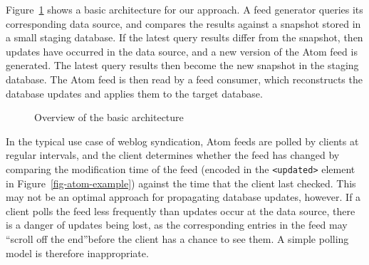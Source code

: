 \documentclass{CRPITStyle}
\begin{document}
Figure~\ref{fig-basic} shows a basic architecture for our approach. A
feed generator queries its corresponding data source, and compares the
results against a snapshot stored in a small staging database. If the
latest query results differ from the snapshot, then updates have
occurred in the data source, and a new version of the Atom feed is
generated. The latest query results then become the new snapshot in the
staging database. The Atom feed is then read by a feed consumer, which
reconstructs the database updates and applies them to the target
database.


\begin{figure}[htb]
	\caption{Overview of the basic architecture}
	\label{fig-basic}
\end{figure}


In the typical use case of weblog syndication, Atom feeds are polled by
clients at regular intervals, and the client determines whether the feed
has changed by comparing the modification time of the feed (encoded in
the \verb|<updated>| element in Figure~\ref{fig-atom-example}) against
the time that the client last checked. This may not be an optimal
approach for propagating database updates, however. If a client polls
the feed less frequently than updates occur at the data source, there is
a danger of updates being lost, as the corresponding entries in the feed
may ``scroll off the end''before the client has a chance to see them. A
simple polling model is therefore inappropriate.
\end{document}
